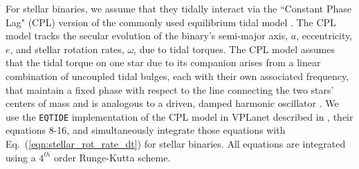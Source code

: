 \documentclass[twocolumn]{aastex61}
\newcommand{\eqtide}[0]{\texttt{EQTIDE}\xspace}
\begin{document}
For stellar binaries, we assume that they tidally interact via the ``Constant Phase Lag" (CPL) version \citep[][]{FerrazMello2008,Heller2011} of the commonly used equilibrium tidal model \citep{Darwin1880}.  The CPL model tracks the secular evolution of the binary's semi-major axis, $a$, eccentricity, $e$, and stellar rotation rates, $\omega$, due to tidal torques.  The CPL model assumes that the tidal torque on one star due to its companion arises from a linear combination of uncoupled tidal bulges, each with their own associated frequency, that maintain a fixed phase with respect to the line connecting the two stars' centers of mass and is analogous to a driven, damped harmonic oscillator \citep{Greenberg2009}. We use the \eqtide implementation of the CPL model in VPLanet described in \citet{Fleming2018}, their equations 8-16, and simultaneously integrate those equations with Eq.~(\ref{eqn:stellar_rot_rate_dt}) for stellar binaries.  All equations are integrated using a $4^{th}$ order Runge-Kutta scheme.

\end{document}
